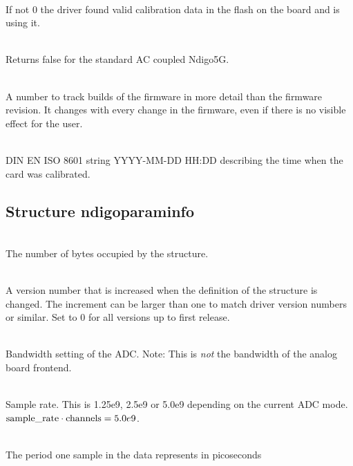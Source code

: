             \\
            If not 0 the driver found valid calibration data in the flash on the board and is using it.\par

            \\
            Returns false for the standard AC coupled Ndigo5G.\par

            \\
            A number to track builds of the firmware in more detail than the firmware revision. It changes with every change in the firmware, even if there is no visible effect for the user.\par

            \\
            DIN EN ISO 8601 string YYYY-MM-DD HH:DD describing the time when the card was calibrated.

        \subsection{Structure ndigo\tu param\tu info}

            \\
            The number of bytes occupied by the structure.\par

            \\
            A version number that is increased when the definition of the structure is changed. The increment can be larger than one to match driver version numbers or similar. Set to 0 for all versions up to
first release.\par

            \\
            Bandwidth setting of the ADC. Note: This is \emph{not} the bandwidth of the analog board frontend. \par

            \\
            Sample rate. This is 1.25e9, 2.5e9 or 5.0e9 depending on the current ADC mode. $\text{sample\textunderscore rate}\cdot \text{channels} = 5.0e9$.\par

            \\
            The period one sample in the data represents in picoseconds\par

